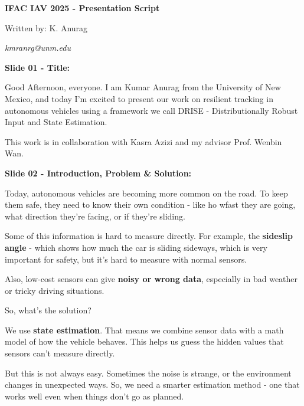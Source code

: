 \documentclass[handout, aspectratio=169]{beamer}
\begin{document}
\begin{frame}
    \textbf{IFAC IAV 2025 - Presentation Script}
    
    Written by: K. Anurag

    \textit{kmranrg@unm.edu}
\end{frame}

\begin{frame}
    \textbf{Slide 01 - Title:}
    
    Good Afternoon, everyone. I am Kumar Anurag from the University of New Mexico, and today I'm excited to present our work on resilient tracking in autonomous vehicles using a framework we call DRISE - Distributionally Robust Input and State Estimation.

    This work is in collaboration with Kasra Azizi and my advisor Prof. Wenbin Wan.
\end{frame}

\begin{frame}
    \textbf{Slide 02 - Introduction, Problem \& Solution:}

    Today, autonomous vehicles are becoming more common on the road. To keep them safe, they need to know their own condition - like ho wfast they are going, what direction they're facing, or if they're sliding.

    Some of this information is hard to measure directly. For example, the \textbf{sideslip angle} - which shows how much the car is sliding sideways, which is very important for safety, but it's hard to measure with normal sensors.

    Also, low-cost sensors can give \textbf{noisy or wrong data}, especially in bad weather or tricky driving situations.

    So, what's the solution?

    We use \textbf{state estimation}. That means we combine sensor data with a math model of how the vehicle behaves. This helps us guess the hidden values that sensors can't measure directly.

    But this is not always easy. Sometimes the noise is strange, or the environment changes in unexpected ways. So, we need a smarter estimation method - one that works well even when things don't go as planned.
\end{frame}
\end{document}
